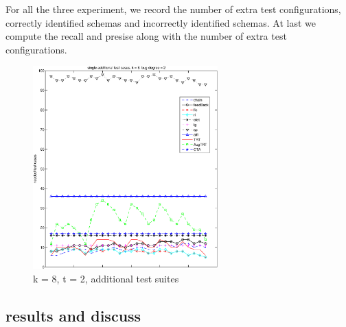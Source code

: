 \documentclass[10pt,journal,cspaper,compsoc]{IEEEtran}
\begin{document}
For all the three experiment, we record the number of extra test configurations, correctly identified schemas and incorrectly identified schemas. At last we compute the recall and presise along with the number of extra test configurations.

\begin{figure}
 \centering
 \includegraphics[width=2.8in]{single.eps}
 \caption{k = 8, t = 2, additional test suites}
 \label{fig_single}
\end{figure}

\subsection{results and discuss}
\end{document}
